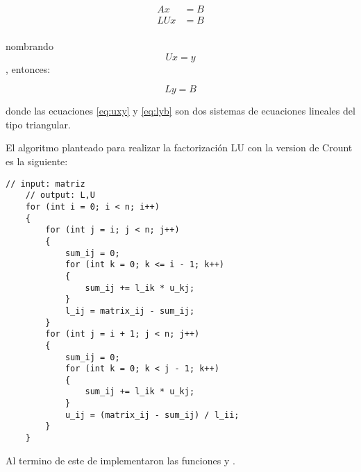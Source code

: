 \begin{align*}
    Ax  & =B \\
    LUx & =B \\
\end{align*}

nombrando
\begin{equation}
    Ux=y \label{eq:uxy}
\end{equation}
, entonces:

\begin{equation}
    Ly=B
    \label{eq:lyb}
\end{equation}

donde las ecuaciones \ref{eq:uxy} y \ref{eq:lyb}  son dos sistemas de ecuaciones lineales del tipo triangular.

El algoritmo planteado para realizar la factorización LU con la version de Crount es la siguiente:

\begin{lstlisting}[style=CStyle]
    // input: matriz
    // output: L,U
    for (int i = 0; i < n; i++)
    {
        for (int j = i; j < n; j++)
        {
            sum_ij = 0;
            for (int k = 0; k <= i - 1; k++)
            {
                sum_ij += l_ik * u_kj;
            }
            l_ij = matrix_ij - sum_ij;
        }
        for (int j = i + 1; j < n; j++)
        {
            sum_ij = 0;
            for (int k = 0; k < j - 1; k++)
            {
                sum_ij += l_ik * u_kj;
            }
            u_ij = (matrix_ij - sum_ij) / l_ii;
        }
    }
\end{lstlisting}

Al termino de este de implementaron las funciones  y .
